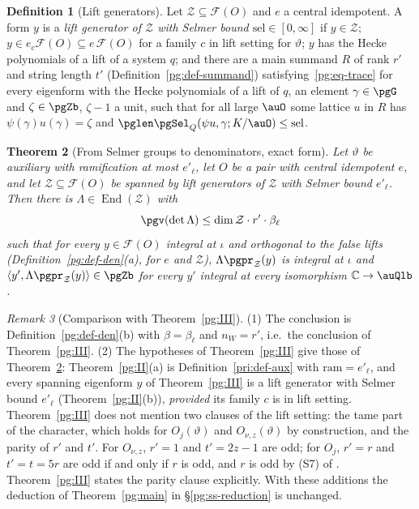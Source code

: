 \documentclass[10pt]{amsart}
\newtheorem{theorem}{Theorem}[section]
\theoremstyle{definition}
\newtheorem{definition}[theorem]{Definition}
\theoremstyle{remark}
\newtheorem{remark}[theorem]{Remark}
\newcommand{\C}{\mathbb C}
\begin{document}
\begin{definition}[Lift generators]\label{pri:def-gen}
Let $\mathcal Z\subseteq\mathcal F(O)$ and $e$ a central idempotent. A form $y$ is a \emph{lift
generator of $\mathcal Z$ with Selmer bound $\mathrm{sel}\in[0,\infty]$} if $y\in\mathcal Z$; $y\in
e_c\mathcal F(O)\subseteq e\,\mathcal F(O)$ for a family $c$ in lift setting for $\vartheta$; $y$
has the Hecke polynomials of a lift of a system $q$; and there are a main summand $R$ of rank
$r'$ and string length $t'$ (Definition~\ref{pg:def-summand}) satisfying~\eqref{pg:eq-trace} for
every eigenform with the Hecke polynomials of a lift of $q$, an element $\gamma\in\pgG$ and
$\zeta\in\pgZb$, $\zeta-1$ a unit, such that for all large $\auO$ some lattice $u$ in $R$ has
$\psi(\gamma)u(\gamma)=\zeta$ and $\pglen\pgSel_Q(\psi u,\gamma;K/\auO)\le\mathrm{sel}$.
\end{definition}

\begin{theorem}[From Selmer groups to denominators, exact form]\label{pri:III}
Let $\vartheta$ be auxiliary with ramification at most $e'_\ell$, let $O$ be a pair with central
idempotent $e$, and let $\mathcal Z\subseteq\mathcal F(O)$ be spanned by lift generators of
$\mathcal Z$ with Selmer bound $e'_\ell$. Then there is $\Lambda\in\operatorname{End}(\mathcal Z)$
with
\[
\pgv(\det\Lambda)\le\dim\mathcal Z\cdot r'\cdot\beta_\ell
\]
such that for every $y\in\mathcal F(O)$ integral at $\iota$ and orthogonal to the false lifts
(Definition~\ref{pg:def-den}(a), for $e$ and $\mathcal Z$), $\Lambda\pgpr_{\mathcal Z}(y)$ is
integral at $\iota$ and $\langle y',\Lambda\pgpr_{\mathcal Z}(y)\rangle\in\pgZb$ for every $y'$
integral at every isomorphism $\C\to\auQlb$.
\end{theorem}

\begin{remark}[Comparison with Theorem~\ref{pg:III}]\label{pri:rem-compare}
(1) The conclusion is Definition~\ref{pg:def-den}(b) with $\beta=\beta_\ell$ and $n_W=r'$, i.e.\
the conclusion of Theorem~\ref{pg:III}. (2) The hypotheses of Theorem~\ref{pg:III} give those of
Theorem~\ref{pri:III}: Theorem~\ref{pg:II}(a) is Definition~\ref{pri:def-aux} with
$\mathrm{ram}=e'_\ell$, and every spanning eigenform $y$ of Theorem~\ref{pg:III} is a lift
generator with Selmer bound $e'_\ell$ (Theorem~\ref{pg:II}(b)), \emph{provided} its family $c$ is in
lift setting. Theorem~\ref{pg:III} does not mention two clauses of the lift setting: the tame part
of the character, which holds for $O_j(\vartheta)$ and $O_{\nu,z}(\vartheta)$ by construction, and
the parity of $r'$ and $t'$. For $O_{\nu,z}$, $r'=1$ and $t'=2z-1$ are odd; for $O_j$, $r'=r$ and
$t'=t=5r$ are odd if and only if $r$ is odd, and $r$ is odd by (S7) of {\cite[Lemma~13.4]{P46}}.
Theorem~\ref{pg:III} states the parity clause explicitly. With these additions the deduction of
Theorem~\ref{pg:main} in \S\ref{pg:ss-reduction} is unchanged.
\end{remark}
\end{document}
